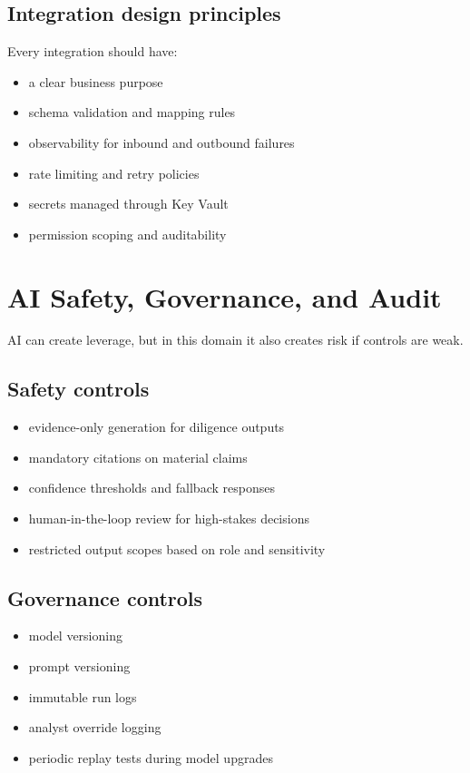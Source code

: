 \documentclass[11pt]{article}
\begin{document}
\subsection{Integration design principles}

Every integration should have:

\begin{itemize}
\item a clear business purpose
\item schema validation and mapping rules
\item observability for inbound and outbound failures
\item rate limiting and retry policies
\item secrets managed through Key Vault
\item permission scoping and auditability
\end{itemize}

\section{AI Safety, Governance, and Audit}

AI can create leverage, but in this domain it also creates risk if controls are weak.

\subsection{Safety controls}

\begin{itemize}
\item evidence-only generation for diligence outputs
\item mandatory citations on material claims
\item confidence thresholds and fallback responses
\item human-in-the-loop review for high-stakes decisions
\item restricted output scopes based on role and sensitivity
\end{itemize}

\subsection{Governance controls}

\begin{itemize}
\item model versioning
\item prompt versioning
\item immutable run logs
\item analyst override logging
\item periodic replay tests during model upgrades
\end{itemize}
\end{document}
